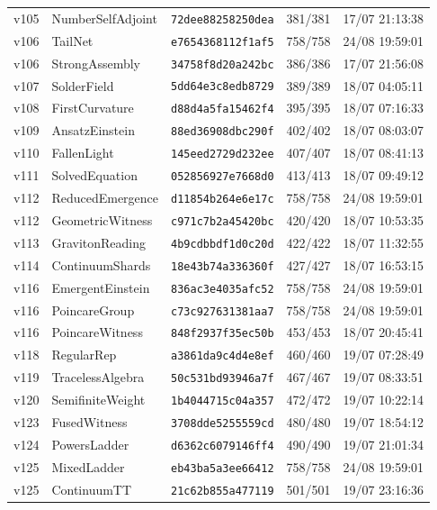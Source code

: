 \documentclass[11pt]{article}
\theoremstyle{definition}\newtheorem{deriv}{Derivação}
\begin{document}
{\begin{longtable}{@{}lllll@{}}
v105 & NumberSelfAdjoint & \texttt{72dee88258250dea} & 381/381 & 17/07 21:13:38 \\
v106 & TailNet & \texttt{e7654368112f1af5} & 758/758 & 24/08 19:59:01 \\
v106 & StrongAssembly & \texttt{34758f8d20a242bc} & 386/386 & 17/07 21:56:08 \\
v107 & SolderField & \texttt{5dd64e3c8edb8729} & 389/389 & 18/07 04:05:11 \\
v108 & FirstCurvature & \texttt{d88d4a5fa15462f4} & 395/395 & 18/07 07:16:33 \\
v109 & AnsatzEinstein & \texttt{88ed36908dbc290f} & 402/402 & 18/07 08:03:07 \\
v110 & FallenLight & \texttt{145eed2729d232ee} & 407/407 & 18/07 08:41:13 \\
v111 & SolvedEquation & \texttt{052856927e7668d0} & 413/413 & 18/07 09:49:12 \\
v112 & ReducedEmergence & \texttt{d11854b264e6e17c} & 758/758 & 24/08 19:59:01 \\
v112 & GeometricWitness & \texttt{c971c7b2a45420bc} & 420/420 & 18/07 10:53:35 \\
v113 & GravitonReading & \texttt{4b9cdbbdf1d0c20d} & 422/422 & 18/07 11:32:55 \\
v114 & ContinuumShards & \texttt{18e43b74a336360f} & 427/427 & 18/07 16:53:15 \\
v116 & EmergentEinstein & \texttt{836ac3e4035afc52} & 758/758 & 24/08 19:59:01 \\
v116 & PoincareGroup & \texttt{c73c927631381aa7} & 758/758 & 24/08 19:59:01 \\
v116 & PoincareWitness & \texttt{848f2937f35ec50b} & 453/453 & 18/07 20:45:41 \\
v118 & RegularRep & \texttt{a3861da9c4d4e8ef} & 460/460 & 19/07 07:28:49 \\
v119 & TracelessAlgebra & \texttt{50c531bd93946a7f} & 467/467 & 19/07 08:33:51 \\
v120 & SemifiniteWeight & \texttt{1b4044715c04a357} & 472/472 & 19/07 10:22:14 \\
v123 & FusedWitness & \texttt{3708dde5255559cd} & 480/480 & 19/07 18:54:12 \\
v124 & PowersLadder & \texttt{d6362c6079146ff4} & 490/490 & 19/07 21:01:34 \\
v125 & MixedLadder & \texttt{eb43ba5a3ee66412} & 758/758 & 24/08 19:59:01 \\
v125 & ContinuumTT & \texttt{21c62b855a477119} & 501/501 & 19/07 23:16:36 \\

\end{longtable}}
\end{document}

